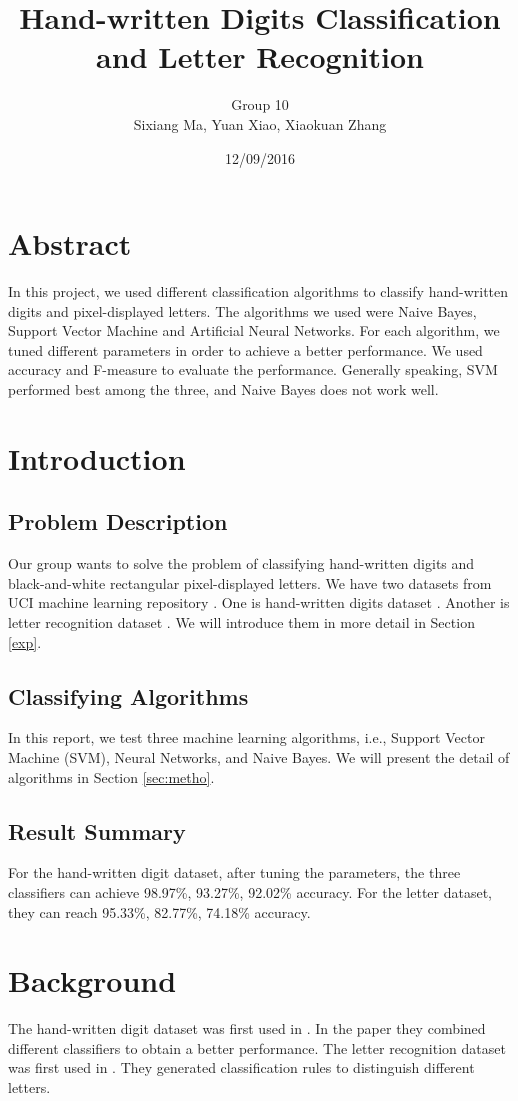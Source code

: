 \documentclass[11pt]{article}
\title{Hand-written Digits Classification and Letter Recognition}
\author{Group 10 \\ Sixiang Ma, Yuan Xiao, Xiaokuan Zhang}
\date{12/09/2016}
\begin{document}
\maketitle
\section*{Abstract}
In this project, we used different classification algorithms to classify hand-written digits and pixel-displayed letters. The algorithms we used were Naive Bayes, Support Vector Machine and Artificial Neural Networks. For each algorithm, we tuned different parameters in order to achieve a better performance. We used accuracy and F-measure to evaluate the performance. Generally speaking, SVM performed best among the three, and Naive Bayes does not work well. 


\section{Introduction}

\subsection{Problem Description}
Our group wants to solve the problem of classifying hand-written digits and  black-and-white rectangular pixel-displayed letters. We have two datasets from UCI machine learning repository \cite{Lichman2013}. One is hand-written digits dataset \cite{digitdataset}. Another is letter recognition dataset \cite{letterdataset}. We will introduce them in more detail in Section \ref{exp}.

\subsection{Classifying Algorithms}
In this report, we test three machine learning  algorithms, i.e., Support Vector Machine (SVM), Neural Networks, and Naive Bayes. We will present the detail of algorithms in Section \ref{sec:metho}.
\subsection{Result Summary}
For the hand-written digit dataset, after tuning the parameters, the three classifiers can achieve 98.97\%, 93.27\%, 92.02\%  accuracy. For the letter dataset, they can reach 95.33\%, 82.77\%, 74.18\% accuracy.

\section{Background}
The hand-written digit dataset was first used in \cite{kaynak1995methods}. In the paper they combined different classifiers to obtain a better performance.  The letter recognition dataset was first used in \cite{frey1991letter}. They generated classification rules to distinguish different letters.
\end{document}
